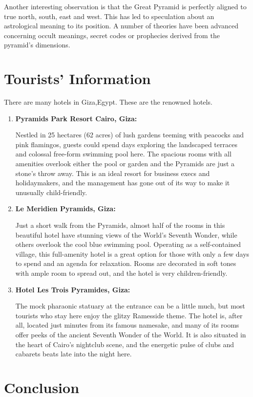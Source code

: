 \documentclass[12 pt]{article}
\begin{document}
Another interesting observation is that the Great Pyramid is perfectly aligned to true north, south, east and west. This has led to speculation about an astrological meaning to its position. A number of theories have been advanced concerning occult meanings, secret codes or prophecies derived from the pyramid's dimensions.

\section{Tourists' Information} 
There are many hotels in Giza,Egypt. These are the renowned hotels.
\begin{enumerate}
\item{\bfseries Pyramids Park Resort Cairo, Giza: }

Nestled in 25 hectares (62 acres) of lush gardens teeming with peacocks and pink flamingos, guests could spend days exploring the landscaped terraces and colossal free-form swimming pool here. The spacious rooms with all amenities overlook either the pool or garden and the Pyramids are just a stone's throw away. This is an ideal resort for business execs and holidaymakers, and the management has gone out of its way to make it unusually child-friendly.
\item{\bfseries Le Meridien Pyramids, Giza:}

Just a short walk from the Pyramids, almost half of the rooms in this beautiful hotel have stunning views of the World's Seventh Wonder, while others overlook the cool blue swimming pool. Operating as a self-contained village, this full-amenity hotel is a great option for those with only a few days to spend and an agenda for relaxation. Rooms are decorated in soft tones with ample room to spread out, and the hotel is very children-friendly.

\item{\bfseries Hotel Les Trois Pyramides, Giza:}

The mock pharaonic statuary at the entrance can be a little much, but most tourists who stay here enjoy the glitzy Ramesside theme. The hotel is, after all, located just minutes from its famous namesake, and many of its rooms offer peeks of the ancient Seventh Wonder of the World. It is also situated in the heart of Cairo's nightclub scene, and the energetic pulse of clubs and cabarets beats late into the night here.
\end{enumerate}



\section{Conclusion}
\end{document}
